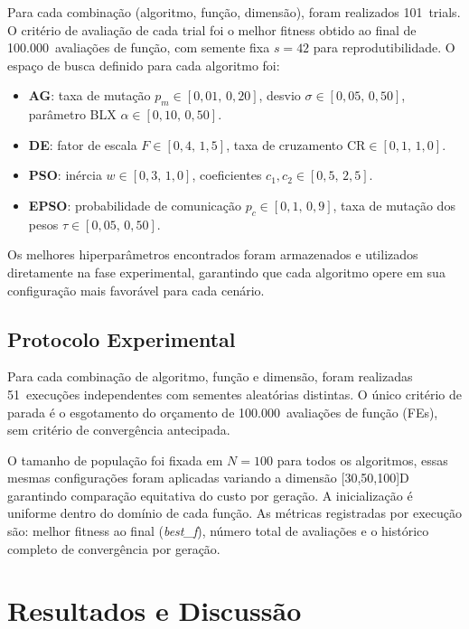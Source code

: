 \documentclass[runningheads]{llncs}
\begin{document}
Para cada combinação (algoritmo, função, dimensão), foram realizados
101~trials. O critério de avaliação de cada trial foi o melhor fitness
obtido ao final de 100.000~avaliações de função, com semente fixa
$s=42$ para reprodutibilidade. O espaço de busca definido para cada
algoritmo foi:

\begin{itemize}
  \item \textbf{AG}: taxa de mutação $p_m \in [0{,}01,\,0{,}20]$,
        desvio $\sigma \in [0{,}05,\,0{,}50]$,
        parâmetro BLX $\alpha \in [0{,}10,\,0{,}50]$.
  \item \textbf{DE}: fator de escala $F \in [0{,}4,\,1{,}5]$,
        taxa de cruzamento $\text{CR} \in [0{,}1,\,1{,}0]$.
  \item \textbf{PSO}: inércia $w \in [0{,}3,\,1{,}0]$,
        coeficientes $c_1, c_2 \in [0{,}5,\,2{,}5]$.
  \item \textbf{EPSO}: probabilidade de comunicação
        $p_c \in [0{,}1,\,0{,}9]$,
        taxa de mutação dos pesos $\tau \in [0{,}05,\,0{,}50]$.
\end{itemize}

Os melhores hiperparâmetros encontrados foram armazenados e utilizados
diretamente na fase experimental, garantindo que cada algoritmo opere
em sua configuração mais favorável para cada cenário.

\subsection{Protocolo Experimental}

Para cada combinação de algoritmo,
função e dimensão, foram realizadas 51~execuções independentes com
sementes aleatórias distintas. O único critério de parada é o
esgotamento do orçamento de 100.000~avaliações de função (FEs),
sem critério de convergência antecipada.

O tamanho de população foi fixada em $N=100$ para todos os
algoritmos, essas mesmas configurações foram aplicadas variando a dimensão [30,50,100]D garantindo comparação equitativa do custo
por geração. A inicialização é uniforme dentro do domínio de cada
função. As métricas registradas por execução são: melhor fitness
ao final (\emph{best\_f}), número total de avaliações e o
histórico completo de convergência por geração.

\section{Resultados e Discuss\~{a}o}
\label{sec:resultados}
\end{document}
